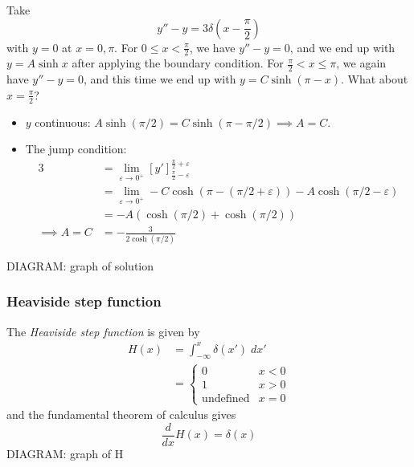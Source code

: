 \documentclass{../template/note}
\begin{document}
    \begin{example}
        Take
        \[
            y'' - y = 3\delta\left(x-\frac{\pi}{2}\right)
        \]
        with \(y = 0\) at \(x = 0, \pi\). For \(0 \leq x < \frac{\pi}{2}\), we have \(y'' - y = 0\), and we end up with \(y = A \sinh x\) after applying the boundary condition. For \(\frac{\pi}{2} < x \leq \pi\), we again have \(y'' - y = 0\), and this time we end up with \(y = C \sinh(\pi - x)\). What about \(x = \frac{\pi}{2}\)?
        \begin{itemize}
            \item \(y\) continuous: \(A \sinh(\pi/2) = C\sinh(\pi - \pi/2) \implies A = C\).
            \item The jump condition:
            \begin{align*}
                3 &= \lim_{\varepsilon \to 0^+} \left[y'\right]_{\frac{\pi}{2} - \varepsilon}^{\frac{\pi}{2} + \varepsilon} \\
                &= \lim_{\varepsilon \to 0^+} -C \cosh(\pi - (\pi/2 + \varepsilon)) -A \cosh(\pi/2 - \varepsilon) \\
                &= -A(\cosh(\pi/2) + \cosh(\pi/2)) \\
                \implies A = C &= -\frac{3}{2 \cosh(\pi/2)}
            \end{align*}           
        \end{itemize}
        DIAGRAM: graph of solution
    \end{example}
    
    \subsubsection{Heaviside step function}

    \begin{definition}
        The \emph{Heaviside step function} is given by
        \begin{align*}
            H(x) &= \int_{-\infty}^x \delta(x') \; dx' \\
            &= \begin{cases}
                0 & x < 0 \\
                1 & x > 0 \\
                \text{undefined} & x = 0
            \end{cases}
        \end{align*}
        and the fundamental theorem of calculus gives
        \[
            \frac{d}{dx} H(x) = \delta(x)
        \]
        DIAGRAM: graph of H
    \end{definition}
    
\end{document}
